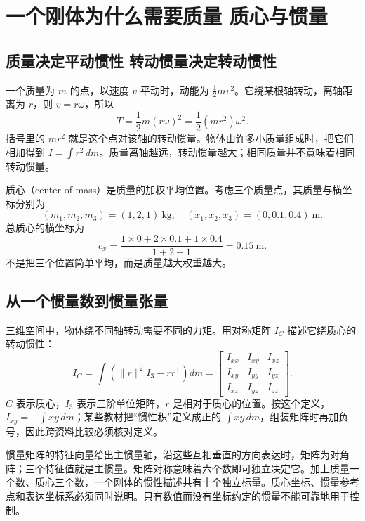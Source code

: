 \section{一个刚体为什么需要质量 质心与惯量}
\subsection{质量决定平动惯性 转动惯量决定转动惯性}
一个质量为 $m$ 的点，以速度 $v$ 平动时，动能为 $\tfrac12 mv^2$。它绕某根轴转动，离轴距离为 $r$，则 $v=r\omega$，所以
\begin{equation}
 T=\frac12m(r\omega)^2=\frac12(mr^2)\omega^2.
\end{equation}
括号里的 $mr^2$ 就是这个点对该轴的转动惯量。物体由许多小质量组成时，把它们相加得到 $I=\int r^2\,dm$。质量离轴越远，转动惯量越大；相同质量并不意味着相同转动惯量。

质心（center of mass）是质量的加权平均位置。考虑三个质量点，其质量与横坐标分别为
\[
 (m_1,m_2,m_3)=(1,2,1)\ \mathrm{kg},\quad
 (x_1,x_2,x_3)=(0,0.1,0.4)\ \mathrm m.
\]
总质心的横坐标为
\begin{equation}
 c_x=\frac{1\times0+2\times0.1+1\times0.4}{1+2+1}=0.15\ \mathrm m.
\end{equation}
不是把三个位置简单平均，而是质量越大权重越大。

\subsection{从一个惯量数到惯量张量}
三维空间中，物体绕不同轴转动需要不同的力矩。用对称矩阵 $I_C$ 描述它绕质心的转动惯性：
\begin{equation}
 I_C=\int\left(\|r\|^2I_3-rr^{\mathsf T}\right)dm
 =\begin{bmatrix}I_{xx}&I_{xy}&I_{xz}\\I_{xy}&I_{yy}&I_{yz}\\I_{xz}&I_{yz}&I_{zz}\end{bmatrix}.
\end{equation}
$C$ 表示质心，$I_3$ 表示三阶单位矩阵，$r$ 是相对于质心的位置。按这个定义，$I_{xy}=-\int xy\,dm$；某些教材把“惯性积”定义成正的 $\int xy\,dm$，组装矩阵时再加负号，因此跨资料比较必须核对定义。

惯量矩阵的特征向量给出主惯量轴，沿这些互相垂直的方向表达时，矩阵为对角阵；三个特征值就是主惯量。矩阵对称意味着六个数即可独立决定它。加上质量一个数、质心三个数，一个刚体的惯性描述共有十个独立标量。质心坐标、惯量参考点和表达坐标系必须同时说明。只有数值而没有坐标约定的惯量不能可靠地用于控制。

